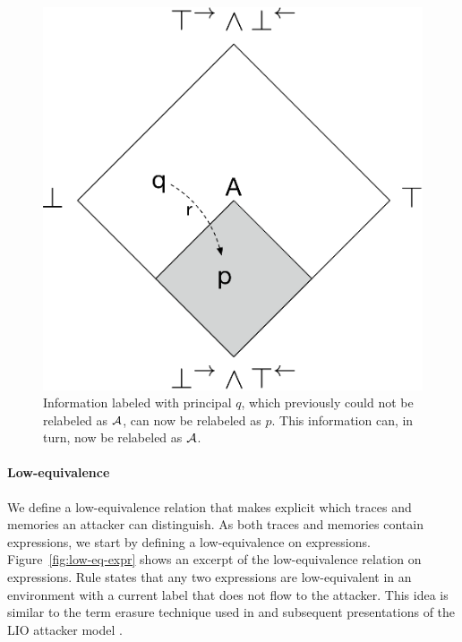 \begin{figure}
    \centering
    \includegraphics[scale=0.25]{Illustrations/bad-flow.pdf}
    \caption{Information labeled with principal $q$, which previously could not be relabeled as $\mathcal{A}$, can now be relabeled as $p$. This information can, in turn, now be relabeled as $\mathcal{A}$.}
    \label{fig:bad-release}
\end{figure}

\paragraph{Low-equivalence}
We define a low-equivalence relation that makes explicit which traces and memories an attacker can distinguish. As both traces and memories contain expressions, we start by defining a low-equivalence on expressions. Figure~\ref{fig:low-eq-expr} shows an excerpt of the low-equivalence relation on expressions. Rule  states that any two expressions are low-equivalent in an environment with a current label that does not flow to the attacker. This idea is similar to the term erasure technique used in \cite{SRMMlio} and subsequent presentations of the LIO attacker model \cite{Stefan:2012:ACT:2364527.2364557, 10.1007/978-3-642-40203-6_40, 10.1007/978-3-319-24858-5_13}.

